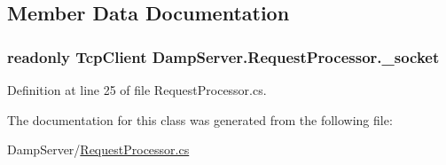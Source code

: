 \subsection{Member Data Documentation}
\hypertarget{class_damp_server_1_1_request_processor_a79b6a878c147c3473cb1b6feb99fafac}{
\subsubsection[{\-\_\-socket}]{\setlength{\rightskip}{0pt plus 5cm}readonly Tcp\-Client Damp\-Server.\-Request\-Processor.\-\_\-socket\hspace{0.3cm}{\ttfamily [private]}}}\label{class_damp_server_1_1_request_processor_a79b6a878c147c3473cb1b6feb99fafac}


Definition at line 25 of file Request\-Processor.\-cs.



The documentation for this class was generated from the following file\-:\begin{DoxyCompactItemize}
\item 
Damp\-Server/\hyperlink{_request_processor_8cs}{Request\-Processor.\-cs}\end{DoxyCompactItemize}

